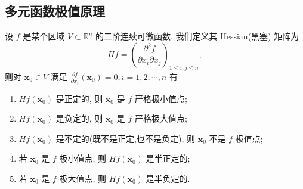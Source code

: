 \documentclass[../../main.tex]{subfiles}%
\begin{document}
\subsection{多元函数极值原理}

\begin{theorem}[多元函数极值原理]\label{theorem:多元函数极值原理}
设 \( f \) 是某个区域 \( V \subset \mathbb{R}^n \) 的二阶连续可微函数, 我们定义其 Hessian(黑塞) 矩阵为
\[
Hf = \left( \frac{\partial^2 f}{\partial x_i \partial x_j} \right)_{1 \leqslant i, j \leqslant n},
\]
则对 \( \mathbf{x}_0 \in V \) 满足 \( \frac{\partial f}{\partial x_i}(\mathbf{x}_0) = 0, i = 1, 2, \cdots, n \) 有
\begin{enumerate}[(1)]
\item \( Hf(\mathbf{x}_0) \) 是正定的, 则 \( \mathbf{x}_0 \) 是 \( f \) 严格极小值点;

\item \( Hf(\mathbf{x}_0) \) 是负定的, 则 \( \mathbf{x}_0 \) 是 \( f \) 严格极大值点;

\item \( Hf(\mathbf{x}_0) \) 是不定的(既不是正定,也不是负定), 则 \( \mathbf{x}_0 \) 不是 \( f \) 极值点;

\item 若 \( \mathbf{x}_0 \) 是 \( f \) 极小值点, 则 \( Hf(\mathbf{x}_0) \) 是半正定的;

\item 若 \( \mathbf{x}_0 \) 是 \( f \) 极大值点, 则 \( Hf(\mathbf{x}_0) \) 是半负定的.
\end{enumerate}
\end{theorem}
\end{document}
